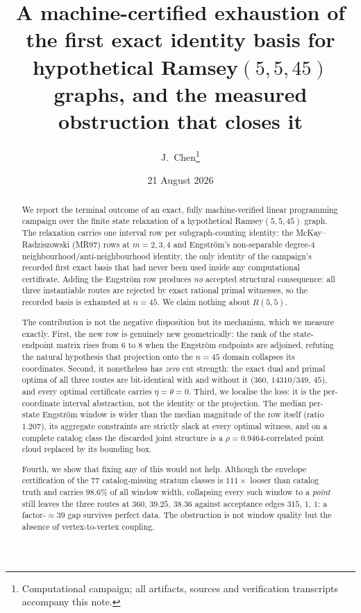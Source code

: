 \documentclass[11pt]{article}
\title{A machine-certified exhaustion of the first exact identity basis for
hypothetical Ramsey$(5,5,45)$ graphs, and the measured obstruction that closes it}
\author{J.\ Chen\thanks{Computational campaign; all artifacts, sources and
verification transcripts accompany this note.}}
\date{21 August 2026}
\theoremstyle{definition}
\newcommand{\Rams}{R}
\begin{document}
\maketitle

\begin{abstract}
We report the terminal outcome of an exact, fully machine-verified linear
programming campaign over the finite state relaxation of a hypothetical
Ramsey$(5,5,45)$ graph. The relaxation carries one interval row per
subgraph-counting identity: the McKay--Radziszowski (MR97) rows at $m=2,3,4$ and
Engstr\"om's non-separable degree-4 neighbourhood/anti-neighbourhood identity,
the only identity of the campaign's recorded first exact basis that had never
been used inside any computational certificate. Adding the Engstr\"om row
produces \emph{no} accepted structural consequence: all three instantiable
routes are rejected by exact rational primal witnesses, so the recorded basis is
exhausted at $n=45$. We claim nothing about $\Rams(5,5)$.

The contribution is not the negative disposition but its mechanism, which we
measure exactly. First, the new row is genuinely new geometrically: the rank of
the state-endpoint matrix rises from $6$ to $8$ when the Engstr\"om endpoints are
adjoined, refuting the natural hypothesis that projection onto the $n=45$ domain
collapses its coordinates. Second, it nonetheless has \emph{zero} cut strength:
the exact dual and primal optima of all three routes are bit-identical with and
without it ($360$, $14310/349$, $45$), and every optimal certificate carries
$\eta=\theta=0$. Third, we localise the loss: it is the per-coordinate interval
abstraction, not the identity or the projection. The median per-state Engstr\"om
window is wider than the median magnitude of the row itself (ratio $1.207$),
its aggregate constraints are strictly slack at every optimal witness, and on a
complete catalog class the discarded joint structure is a
$\rho=0.9464$-correlated point cloud replaced by its bounding box.

Fourth, we show that fixing any of this would not help. Although the envelope
certification of the $77$ catalog-missing stratum classes is $111\times$ looser
than catalog truth and carries $98.6\%$ of all window width, collapsing every
such window to a \emph{point} still leaves the three routes at $360$, $39.25$,
$38.36$ against acceptance edges $315$, $1$, $1$: a factor-$\approx39$ gap
survives perfect data. The obstruction is not window quality but the absence of
vertex-to-vertex coupling.


\end{abstract}
\end{document}
